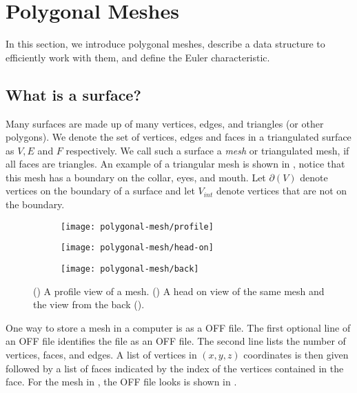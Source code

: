\section{Polygonal Meshes}
\label{sec:polygonal}

In this section, we introduce polygonal meshes, describe a data structure to efficiently
work with them, and define the Euler characteristic.

\subsection{What is a surface?}

 Many surfaces are made up of many vertices, edges, and
triangles (or other polygons). We denote the set of vertices, edges and faces in a triangulated surface as 
$V, E$ and $F$ respectively. We call such a surface a \emph{mesh}
or triangulated mesh, if all faces are triangles.
An example of a triangular mesh is shown in ,
notice that this mesh has a boundary on the collar, eyes, and mouth.
Let $\partial(V)$ denote vertices on the boundary of a surface and let $V_{int}$ 
denote vertices that are not on the boundary.



 \begin{figure}[htb]
         \centering
        \begin{subfigure}[b]{0.3\textwidth}
         \texttt{[image: polygonal-mesh/profile]}
         \caption{}
 	 \label{fig:profile}
       \end{subfigure}
         \hspace{.6cm}
         \begin{subfigure}[b]{0.19\textwidth}
         \texttt{[image: polygonal-mesh/head-on]}
         \caption{}
          \label{fig:head-on}
         \end{subfigure}
             \hspace{.6cm}
         \begin{subfigure}[b]{0.24\textwidth}
         \texttt{[image: polygonal-mesh/back]}
         \caption{}
          \label{fig:back}
         \end{subfigure}
		\caption{() A profile view of a mesh.
 		()  A head on view of the same mesh and the view from the back ().
 		\label{fig:cat}}
 \end{figure}

One way to store a mesh in a computer is as a OFF file.
The first optional line of an OFF file identifies the file as an OFF file.
The second line lists the number of vertices, faces, and edges.
A list of vertices in $(x,y,z)$ coordinates is then given followed
by a list of faces indicated by the index of the vertices contained in the face.
For the mesh in , the OFF file looks is shown in 
.

